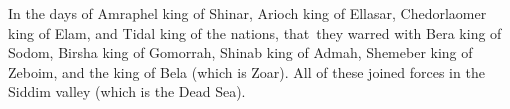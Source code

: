 
\begin{inparaenum}
     In the days of Amraphel king of Shinar, Arioch king of Ellasar, Chedorlaomer king of Elam, and Tidal king of the nations,%
     that\understood\ they warred with Bera king of Sodom, Birsha king of Gomorrah, Shinab king of Admah, Shemeber king of Zeboim, and the king of Bela (which is Zoar).%
     All of these joined forces in the Siddim valley (which is the Dead Sea).%
    
\end{inparaenum}
